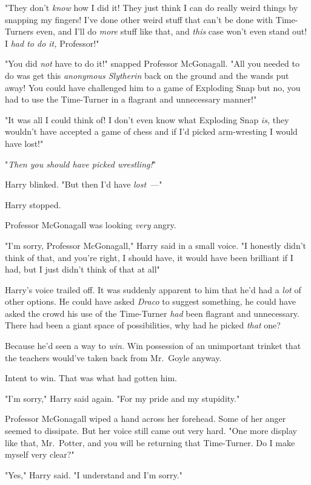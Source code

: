 "They don't \emph{know} how I did it! They just think I can do really weird
things by snapping my fingers! I've done other weird stuff that can't be done
with Time-Turners even, and I'll do \emph{more} stuff like that, and
\emph{this} case won't even stand out! I \emph{had to do it,} Professor!"

"You did \emph{not} have to do it!" snapped Professor McGonagall. "All you
needed to do was get this \emph{anonymous Slytherin} back on the ground and the
wands put away! You could have challenged him to a game of Exploding Snap but
no, you had to use the Time-Turner in a flagrant and unnecessary manner!"

"It was all I could think of! I don't even know what Exploding Snap \emph{is,}
they wouldn't have accepted a game of chess and if I'd picked arm-wresting I
would have lost!"

"\emph{Then you should have picked wrestling!}"

Harry blinked. "But then I'd have \emph{lost}~---"

Harry stopped.

Professor McGonagall was looking \emph{very} angry.

"I'm sorry, Professor McGonagall," Harry said in a small voice. "I honestly
didn't think of that, and you're right, I should have, it would have been
brilliant if I had, but I just didn't think of that at all{\el}"

Harry's voice trailed off. It was suddenly apparent to him that he'd had a
\emph{lot} of other options. He could have asked \emph{Draco} to suggest
something, he could have asked the crowd{\el} his use of the Time-Turner
\emph{had} been flagrant and unnecessary. There had been a giant space of
possibilities, why had he picked \emph{that} one?

Because he'd seen a way to \emph{win.} Win possession of an unimportant trinket
that the teachers would've taken back from Mr.~Goyle anyway.

Intent to win. That was what had gotten him.

"I'm sorry," Harry said again. "For my pride and my stupidity."

Professor McGonagall wiped a hand across her forehead. Some of her anger seemed
to dissipate. But her voice still came out very hard. "One more display like
that, Mr.~Potter, and you will be returning that Time-Turner. Do I make myself
very clear?"

"Yes," Harry said. "I understand and I'm sorry."

